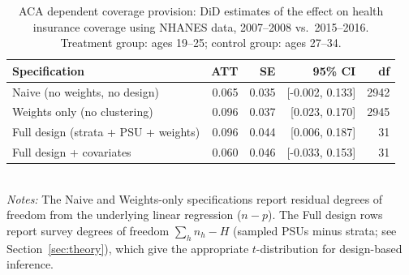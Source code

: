\begin{table}[ht]
\centering
\small
\caption{ACA dependent coverage provision: DiD estimates of the effect on health insurance coverage using NHANES data, 2007--2008 vs.\ 2015--2016. Treatment group: ages 19--25; control group: ages 27--34.}
\label{tab:nhanes}
\begin{tabular}{@{}lrrrr@{}}
\toprule
Specification & ATT & SE & 95\% CI & df \\
\midrule
Naive (no weights, no design) & 0.065 & 0.035 & [-0.002, 0.133] & 2942 \\
Weights only (no clustering) & 0.096 & 0.037 & [0.023, 0.170] & 2945 \\
Full design (strata + PSU + weights) & 0.096 & 0.044 & [0.006, 0.187] & 31 \\
Full design + covariates & 0.060 & 0.046 & [-0.033, 0.153] & 31 \\
\bottomrule
\end{tabular}
\\[2pt]\footnotesize \emph{Notes:} The Naive and Weights-only specifications report residual degrees of freedom from the underlying linear regression ($n - p$). The Full design rows report survey degrees of freedom $\sum_h n_h - H$ (sampled PSUs minus strata; see Section~\ref{sec:theory}), which give the appropriate $t$-distribution for design-based inference.
\end{table}
